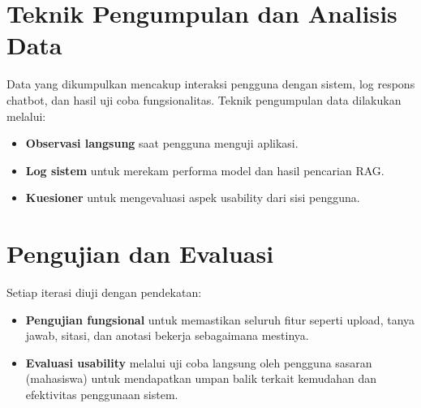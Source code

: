 \section{Teknik Pengumpulan dan Analisis Data}
Data yang dikumpulkan mencakup interaksi pengguna dengan sistem, log respons chatbot, dan hasil uji coba fungsionalitas. Teknik pengumpulan data dilakukan melalui:
\begin{itemize}
  \item \textbf{Observasi langsung} saat pengguna menguji aplikasi.
  \item \textbf{Log sistem} untuk merekam performa model dan hasil pencarian RAG.
  \item \textbf{Kuesioner} untuk mengevaluasi aspek usability dari sisi pengguna.
\end{itemize}

\section{Pengujian dan Evaluasi}
Setiap iterasi diuji dengan pendekatan:
\begin{itemize}
  \item \textbf{Pengujian fungsional} untuk memastikan seluruh fitur seperti upload, tanya jawab, sitasi, dan anotasi bekerja sebagaimana mestinya.
  \item \textbf{Evaluasi usability} melalui uji coba langsung oleh pengguna sasaran (mahasiswa) untuk mendapatkan umpan balik terkait kemudahan dan efektivitas penggunaan sistem.
\end{itemize}